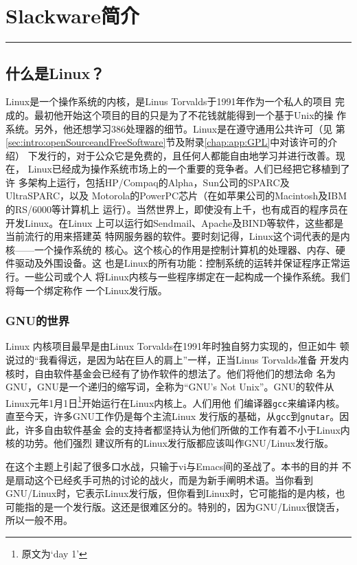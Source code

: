 
\chapter{Slackware简介}
\label{chap:introduction}

\rule[0mm]{\textwidth}{0.1pt}

\section{什么是Linux？}
\label{sec:intro:whatIsLinux}
Linux是一个操作系统的内核，是Linus Torvalds于1991年作为一个私人的项目
完成的。最初他开始这个项目的目的只是为了不花钱就能得到一个基于Unix的操
作系统。另外，他还想学习386处理器的细节。Linux是在遵守通用公共许可（见
第\ref{sec:intro:openSourceandFreeSoftware}节及附录\ref{chap:app:GPL}中对该许可的介绍）
下发行的，对于公众它是免费的，且任何人都能自由地学习并进行改善。现在，
Linux已经成为操作系统市场上的一个重要的竞争者。人们已经把它移植到了许
多架构上运行，包括HP/Compaq的Alpha，Sun公司的SPARC及UltraSPARC，以及
Motorola的PowerPC芯片（在如苹果公司的Macintosh及IBM的RS/6000等计算机上
运行）。当然世界上，即使没有上千，也有成百的程序员在开发Linux。在Linux
上可以运行如Sendmail、Apache及BIND等软件，这些都是当前流行的用来搭建英
特网服务器的软件。要时刻记得，Linux这个词代表的是内核——一个操作系统的
核心。这个核心的作用是控制计算机的处理器、内存、硬件驱动及外围设备。这
也是Linux的所有功能：控制系统的运转并保证程序正常运行。一些公司或个人
将Linux内核与一些程序绑定在一起构成一个操作系统。我们将每一个绑定称作
一个Linux发行版。

\subsection{GNU的世界}
\label{sec:intro:GNU}
Linux 内核项目最早是由Linux Torvalds在1991年时独自努力实现的，但正如牛
顿说过的“我看得远，是因为站在巨人的肩上”一样，正当Linus Torvalds准备
开发内核时，自由软件基金会已经有了协作软件的想法了。他们将他们的想法命
名为GNU，GNU是一个递归的缩写词，全称为“GNU's Not Unix”。GNU的软件从
Linux元年1月1日\footnote{原文为`day 1'}开始运行在Linux内核上。人们用他
们编译器\texttt{gcc}来编译内核。直至今天，许多GNU工作仍是每个主流Linux
发行版的基础，从\texttt{gcc}到\texttt{gnutar}。因此，许多自由软件基金
会的支持者都坚持认为他们所做的工作有着不小于Linux内核的功劳。他们强烈
建议所有的Linux发行版都应该叫作GNU/Linux发行版。

在这个主题上引起了很多口水战，只输于vi与Emacs间的圣战了。本书的目的并
不是扇动这个已经炙手可热的讨论的战火，而是为新手阐明术语。当你看到
GNU/Linux时，它表示Linux发行版，但你看到Linux时，它可能指的是内核，也
可能指的是一个发行版。这还是很难区分的。特别的，因为GNU/Linux很饶舌，
所以一般不用。

